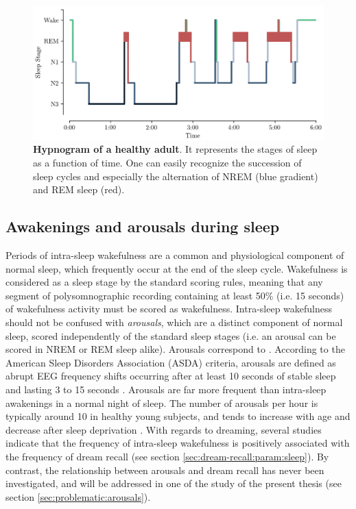 
\begin{figure}[htb]
	\includegraphics[width=\textwidth]{Fig/Intro/Intro_Hypnogram/Intro_Hypnogram.png}
	\caption[Hypnogram of a healthy adult]{\textbf{Hypnogram of a healthy adult}. It represents the stages of sleep as a function of time. One can easily recognize the succession of sleep cycles and especially the alternation of NREM (blue gradient) and REM sleep (red).}
	\label{fig:intro:hypno}
\end{figure}

\subsection{Awakenings and arousals during sleep}
\label{sec:dream-research:sleep:awa-arousal}

Periods of intra-sleep wakefulness are a common and physiological component of normal sleep, which frequently occur at the end of the sleep cycle. Wakefulness is considered as a sleep stage by the standard scoring rules, meaning that any segment of polysomnographic recording containing at least 50\% (i.e. 15 seconds) of wakefulness activity must be scored as wakefulness. Intra-sleep wakefulness should not be confused with \emph{arousals}, which are a distinct component of normal sleep, scored independently of the standard sleep stages (i.e. an arousal can be scored in NREM or REM sleep alike). Arousals correspond to  \citep{peter-derex_heterogeneity_2015}. According to the American Sleep Disorders Association (ASDA) criteria, arousals are defined as abrupt EEG frequency shifts occurring after at least 10 seconds of stable sleep and lasting 3 to 15 seconds \citep{american_sleep_disorders_association_eeg_1992, bonnet_scoring_2007}. Arousals are far more frequent than intra-sleep awakenings in a normal night of sleep. The number of arousals per hour is typically around 10 in healthy young subjects, and tends to increase with age and decrease after sleep deprivation \citep{de_gennaro_eeg_2001, bonnet_eeg_2007}. With regards to dreaming, several studies indicate that the frequency of intra-sleep wakefulness is positively associated with the frequency of dream recall (see section \ref{sec:dream-recall:param:sleep}). By contrast, the relationship between arousals and dream recall has never been investigated, and will be addressed in one of the study of the present thesis (see section \ref{sec:problematic:arousals}).

